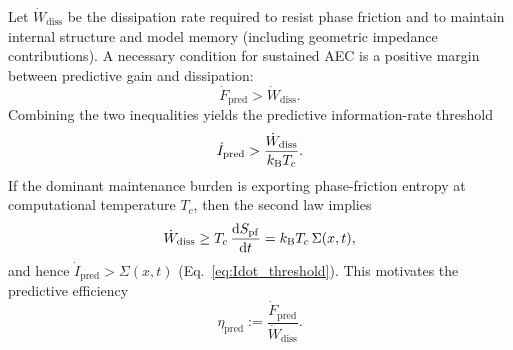 Let $\dot W_{\mathrm{diss}}$ be the dissipation rate required to resist phase friction and to maintain internal structure and model memory (including geometric impedance contributions).
A necessary condition for sustained AEC is a positive margin between predictive gain and dissipation:
\begin{equation}
  \dot F_{\mathrm{pred}}>\dot W_{\mathrm{diss}}.
\end{equation}
Combining the two inequalities yields the predictive information-rate threshold
\begin{equation}
  \dot I_{\mathrm{pred}}>\frac{\dot W_{\mathrm{diss}}}{k_{\mathrm{B}} T_c}.
\end{equation}
If the dominant maintenance burden is exporting phase-friction entropy at computational temperature $T_c$, then the second law implies
\begin{equation}
  \dot W_{\mathrm{diss}} \ge T_c\,\frac{\mathrm{d} S_{\mathrm{pf}}}{\mathrm{d} t}
  = k_{\mathrm{B}} T_c\,\Sigma(x,t),
\end{equation}
and hence $\dot I_{\mathrm{pred}}>\Sigma(x,t)$ (Eq.~\eqref{eq:Idot_threshold}).
This motivates the predictive efficiency
\begin{equation}
  \eta_{\mathrm{pred}} := \frac{\dot F_{\mathrm{pred}}}{\dot W_{\mathrm{diss}}}.
\end{equation}


